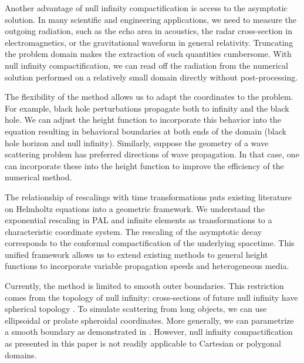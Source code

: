 \documentclass[final,onefignum,onetabnum]{siamart190516}
\begin{document}
Another advantage of null infinity compactification is access to the asymptotic solution. In many scientific and engineering applications, we need to measure the outgoing radiation, such as the echo area in acoustics, the radar cross-section in electromagnetics, or the gravitational waveform in general relativity. Truncating the problem domain makes the extraction of such quantities cumbersome. With null infinity compactification, we can read off the radiation from the numerical solution performed on a relatively small domain directly without post-processing. %

The flexibility of the method allows us to adapt the coordinates to the problem. For example, black hole perturbations propagate both to infinity and the black hole. We can adjust the height function to incorporate this behavior into the equation resulting in behavioral boundaries at both ends of the domain (black hole horizon and null infinity)\cite{ZengFramework}. Similarly, suppose the geometry of a wave scattering problem has preferred directions of wave propagation. In that case, one can incorporate these into the height function to improve the efficiency of the numerical method.


The relationship of rescalings with time transformations puts existing literature on Helmholtz equations into a geometric framework. We understand the exponential rescaling in PAL and infinite elements as transformations to a characteristic coordinate system. The rescaling of the asymptotic decay corresponds to the conformal compactification of the underlying spacetime. This unified framework allows us to extend existing methods to general height functions to incorporate variable propagation speeds and heterogeneous media.
 
Currently, the method is limited to smooth outer boundaries. This restriction comes from the topology of null infinity: cross-sections of future null infinity have spherical topology \cite{Penrose65, Geroch}. To simulate scattering from long objects, we can use ellipsoidal or prolate spheroidal coordinates. More generally, we can parametrize a smooth boundary as demonstrated in \cite{yang2021truly}. However, null infinity compactification as presented in this paper is not readily applicable to Cartesian or polygonal domains.
\end{document}
